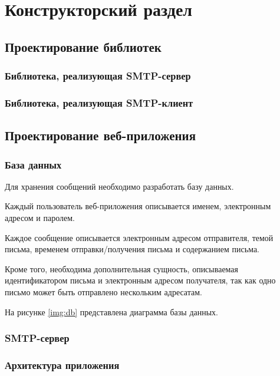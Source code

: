 \chapter{Конструкторский раздел}

\section{Проектирование библиотек}

\subsection{Библиотека, реализующая SMTP-сервер}

\subsection{Библиотека, реализующая SMTP-клиент}

\section{Проектирование веб-приложения}

\subsection{База данных}

Для хранения сообщений необходимо разработать базу данных.

Каждый пользователь веб-приложения описывается именем, электронным адресом и паролем.

Каждое сообщение описывается электронным адресом отправителя, темой письма, временем отправки/получения письма и содержанием письма.

Кроме того, необходима дополнительная сущность, описываемая идентификатором письма и электронным адресом получателя, так как одно письмо может быть отправлено нескольким адресатам.

На рисунке \ref{img:db} представлена диаграмма базы данных.


\subsection{SMTP-сервер}

\subsection{Архитектура приложения}


